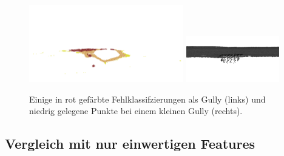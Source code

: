 \begin{figure}
    {\includegraphics[width=0.6\textwidth]{graphics/eval_gully_misclas}}
    {\includegraphics[width=0.36\textwidth]{graphics/low_gully_points}}
    \caption{Einige in rot gefärbte Fehlklassifzierungen als Gully (links) und niedrig gelegene Punkte bei einem kleinen Gully (rechts).}
    \label{fig:gully_misclas}
\end{figure}

\subsection{Vergleich mit nur einwertigen Features}

